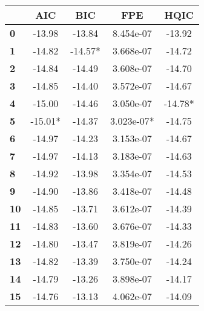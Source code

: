 \begin{center}
\begin{tabular}{lcccc}
\toprule
            & \textbf{AIC} & \textbf{BIC} & \textbf{FPE} & \textbf{HQIC}  \\
\midrule
\textbf{0}  &      -13.98  &      -13.84  &   8.454e-07  &       -13.92   \\
\textbf{1}  &      -14.82  &     -14.57*  &   3.668e-07  &       -14.72   \\
\textbf{2}  &      -14.84  &      -14.49  &   3.608e-07  &       -14.70   \\
\textbf{3}  &      -14.85  &      -14.40  &   3.572e-07  &       -14.67   \\
\textbf{4}  &      -15.00  &      -14.46  &   3.050e-07  &      -14.78*   \\
\textbf{5}  &     -15.01*  &      -14.37  &  3.023e-07*  &       -14.75   \\
\textbf{6}  &      -14.97  &      -14.23  &   3.153e-07  &       -14.67   \\
\textbf{7}  &      -14.97  &      -14.13  &   3.183e-07  &       -14.63   \\
\textbf{8}  &      -14.92  &      -13.98  &   3.354e-07  &       -14.53   \\
\textbf{9}  &      -14.90  &      -13.86  &   3.418e-07  &       -14.48   \\
\textbf{10} &      -14.85  &      -13.71  &   3.612e-07  &       -14.39   \\
\textbf{11} &      -14.83  &      -13.60  &   3.676e-07  &       -14.33   \\
\textbf{12} &      -14.80  &      -13.47  &   3.819e-07  &       -14.26   \\
\textbf{13} &      -14.82  &      -13.39  &   3.750e-07  &       -14.24   \\
\textbf{14} &      -14.79  &      -13.26  &   3.898e-07  &       -14.17   \\
\textbf{15} &      -14.76  &      -13.13  &   4.062e-07  &       -14.09   \\
\bottomrule
\end{tabular}
\end{center}